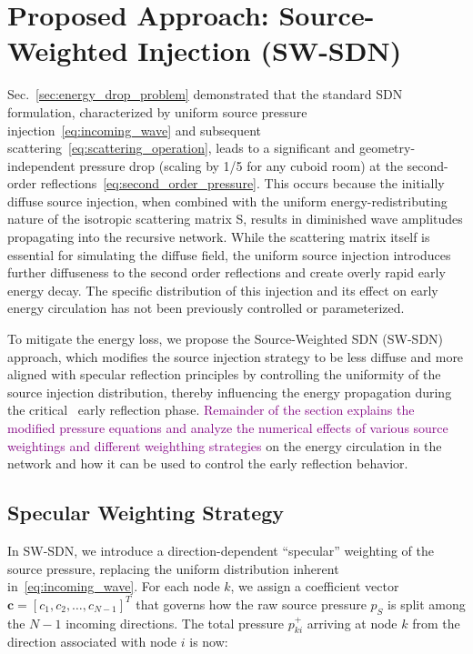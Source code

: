 \documentclass[journal]{IEEEtran}
\begin{document}
\section{Proposed Approach: Source-Weighted Injection (SW-SDN)}
\label{sec:proposed_approach}
Sec.~\ref{sec:energy_drop_problem} demonstrated that the standard SDN formulation, characterized by uniform source pressure injection~\eqref{eq:incoming_wave} and subsequent scattering~\eqref{eq:scattering_operation}, leads to a significant and geometry-independent pressure drop (scaling by 1/5 for any cuboid room) at the second-order reflections~\eqref{eq:second_order_pressure}. 
This occurs because the initially diffuse source injection, when combined with the uniform energy-redistributing nature of the isotropic scattering matrix S, results in diminished wave amplitudes propagating into the recursive network. While the scattering matrix itself is essential for simulating the diffuse field, the uniform source injection introduces further diffuseness to the second order reflections and create overly rapid early energy decay. The specific distribution of this injection and its effect on early energy circulation has not been previously controlled or parameterized.

To mitigate the energy loss, we propose the Source-Weighted SDN (SW-SDN) approach, which modifies the source injection strategy to be less diffuse and more aligned with specular reflection principles by controlling the uniformity of the source injection distribution, thereby influencing the energy propagation during the critical~\cite{karjalainen2005,Barron1988} early reflection phase.
\textcolor{purple}{
Remainder of the section explains the modified pressure equations and analyze the numerical effects of various source weightings and 
different weighthing strategies
}
on the energy circulation in the network and how it can be used to control the early reflection behavior. 

\subsection{Specular Weighting Strategy}
\label{sec:source_weighting_strategy}

In SW-SDN, we introduce a direction-dependent “specular” weighting of the source pressure, replacing the uniform distribution inherent in~\eqref{eq:incoming_wave}. For each node \(k\), we assign a coefficient vector \(\mathbf{c} = [c_1, c_2, \ldots, c_{N-1}]^T\) that governs how the raw source pressure \(p_{S}\) is split among the \(N-1\) incoming directions. The total pressure \(p_{ki}^+\) arriving at node \(k\) from the direction associated with node \(i\) is now:
\end{document}
